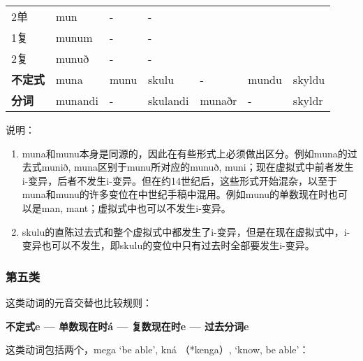 \begin{longtable}{lllllll}
    2单             & mun                      & -                        & -        & ~      & ~      & ~       \\
    1复             & munum                    & -                        & -        & ~      & ~      & ~       \\
    2复             & munuð                    & -                        & -        & ~      & ~      & ~       \\
    \textbf{不定式} & muna                     & munu                     & skulu    & -      & mundu  & skyldu  \\
    \textbf{分词}   & munandi                  & -                        & skulandi & munaðr & -      & skyldr  \\
\end{longtable}

说明：

\begin{enumerate}
    \item
          muna和munu本身是同源的，因此在有些形式上必须做出区分。例如muna的过去式munið,
          muna区别于munu所对应的munuð,
          muni；现在虚拟式中前者发生i-变异，后者不发生i-变异。但在约14世纪后，这些形式开始混杂，以至于muna和munu的许多变位在中世纪手稿中混用。例如munu的单数现在时也可以是man,
          mant；虚拟式中也可以不发生i-变异。
    \item
          skulu的直陈过去式和整个虚拟式中都发生了i-变异，但是在现在虚拟式中，i-变异也可以不发生，即skulu的变位中只有过去时全部要发生i-变异。
\end{enumerate}

\subsubsection{第五类}

这类动词的元音交替也比较规则：

\begin{center}
    \textbf{不定式e --- 单数现在时á --- 复数现在时e --- 过去分词e}
\end{center}

这类动词包括两个，mega `be able‌', kná （*kenga）, `know, be able‌'：

